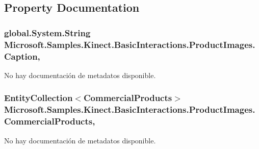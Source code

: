 \subsection{Property Documentation}
\hypertarget{class_microsoft_1_1_samples_1_1_kinect_1_1_basic_interactions_1_1_product_images_a57c9be1b32a5d6b9e81f574f39e2da30}{
\subsubsection[{Caption}]{\setlength{\rightskip}{0pt plus 5cm}global.\-System.\-String Microsoft.\-Samples.\-Kinect.\-Basic\-Interactions.\-Product\-Images.\-Caption\hspace{0.3cm}{\ttfamily [get]}, {\ttfamily [set]}}}\label{class_microsoft_1_1_samples_1_1_kinect_1_1_basic_interactions_1_1_product_images_a57c9be1b32a5d6b9e81f574f39e2da30}


No hay documentación de metadatos disponible. 

\hypertarget{class_microsoft_1_1_samples_1_1_kinect_1_1_basic_interactions_1_1_product_images_aa4491d13d699bf2a309bc6f0bceb8772}{
\subsubsection[{Commercial\-Products}]{\setlength{\rightskip}{0pt plus 5cm}Entity\-Collection$<${\bf Commercial\-Products}$>$ Microsoft.\-Samples.\-Kinect.\-Basic\-Interactions.\-Product\-Images.\-Commercial\-Products\hspace{0.3cm}{\ttfamily [get]}, {\ttfamily [set]}}}\label{class_microsoft_1_1_samples_1_1_kinect_1_1_basic_interactions_1_1_product_images_aa4491d13d699bf2a309bc6f0bceb8772}


No hay documentación de metadatos disponible. 

